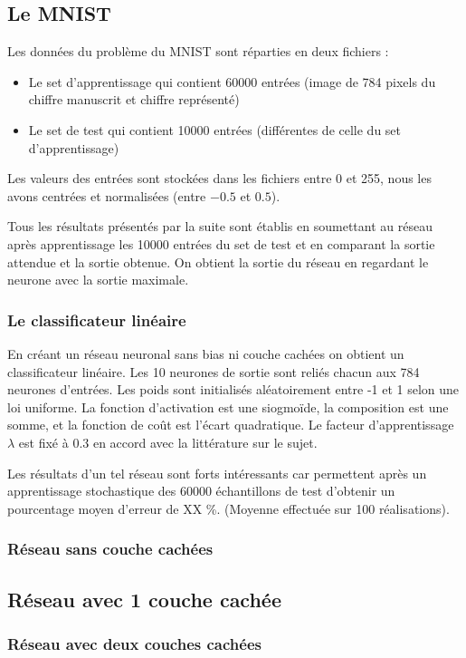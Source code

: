 \subsection{Le MNIST}

Les données du problème du MNIST sont réparties en deux fichiers :
\begin{itemize}
    \item Le set d'apprentissage qui contient 60000 entrées (image de 784 pixels 
          du chiffre manuscrit et chiffre représenté)
    \item Le set de test qui contient 10000 entrées (différentes de celle du set
          d'apprentissage)
\end{itemize}

\medskip

Les valeurs des entrées sont stockées dans les fichiers entre 0 et 255, nous les avons
centrées et normalisées (entre $-0.5$ et $0.5$).

\medskip

Tous les résultats présentés par la suite sont établis en soumettant au réseau
après apprentissage les 10000 entrées du set de test et en comparant la sortie
attendue et la sortie obtenue. On obtient la sortie du réseau en regardant le
neurone avec la sortie maximale.

\subsubsection{Le classificateur linéaire}

En créant un réseau neuronal sans bias ni couche cachées on obtient un classificateur linéaire.
Les 10 neurones de sortie sont reliés chacun aux 784 neurones d'entrées. Les poids sont 
initialisés aléatoirement entre -1 et 1 selon une loi uniforme. La fonction d'activation est
une siogmoïde, la composition est une somme, et la fonction de coût est l'écart quadratique.
Le facteur d'apprentissage $\lambda$ est fixé à $0.3$ en accord avec la littérature sur le sujet.


\medskip

Les résultats d'un tel réseau sont forts intéressants car permettent après un
apprentissage stochastique des 60000 échantillons de test d'obtenir un pourcentage moyen d'erreur
de XX \%. (Moyenne effectuée sur 100 réalisations).

\subsubsection{Réseau sans couche cachées}

\subsection{Réseau avec 1 couche cachée}

\subsubsection{Réseau avec deux couches cachées}




